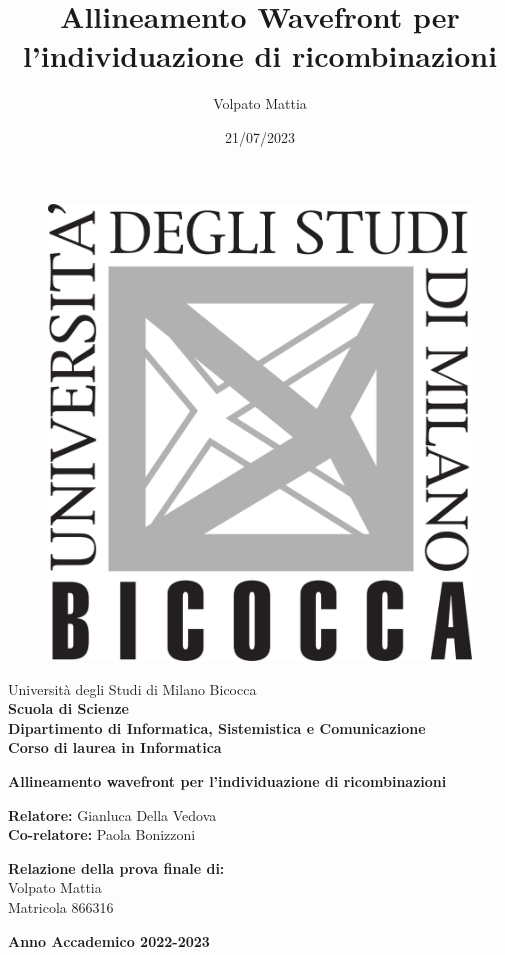 \title{Allineamento Wavefront per l'individuazione di ricombinazioni}
\author{Volpato Mattia}
\date{21/07/2023}

\setlength\intextsep{0pt}
\begin{figure}
    \vspace{-0.25\baselineskip}
    \includegraphics[width=5\baselineskip]{images/logo_bicocca.png}
\end{figure}
\noindent
Università degli Studi di Milano Bicocca \\[8pt]
\textbf{Scuola di Scienze} \\[8pt]
\textbf{Dipartimento di Informatica, Sistemistica e Comunicazione}\\[8pt]
\textbf{Corso di laurea in Informatica}

\vspace{30mm}

\begin{center}
    \Huge
    \textbf{Allineamento wavefront per l'individuazione di ricombinazioni}
\end{center}

\vspace{60mm}

\large
\noindent
\textbf{Relatore:} Gianluca Della Vedova \\[7pt]
\textbf{Co-relatore:} Paola Bonizzoni \\[20pt]
\begin{flushright}
\textbf{Relazione della prova finale di:} \\[7pt]
Volpato Mattia \\[7pt]
Matricola 866316
\end{flushright}
\vspace{30mm}
\centering
\textbf{Anno Accademico 2022-2023}